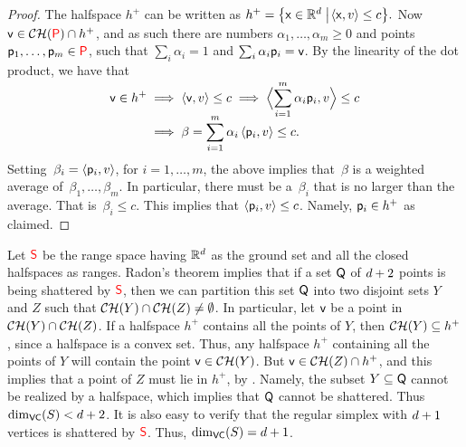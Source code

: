\begin{proof}
    The halfspace $h^+$ can be written as
    \begin{math}
        h^+ = \left\{  {\mathsf{x}} \in \mathbb{R}^d  \;\middle\vert\; \! \left\langle {{{\mathsf{x}}},{v}} \right\rangle \leq
           c \right\}\!.
    \end{math}
     Now $\pntB \in \CHX{\PntSet} \cap h^+$, and as such
    there are numbers $\alpha_1, \ldots, \alpha_m \geq 0$ and points
    $\mathsf{p}_1,\ldots, \mathsf{p}_m \in {{\textcolor{red}{\mathsf{P}}}}$, such that
    $\sum_i \alpha_i = 1$ and $\sum_i \alpha_i \mathsf{p}_i =\mathsf{v}$. By the
    linearity of the dot product, we have that
    \begin{align*}
        \pntB \in h^+ %
        &\implies%
        \DotProd{\pntB }{v} \leq c%
        \implies%
        \DotProd{\Bigl.\smash{\sum_{i=1}^m \alpha_i \pnt_i }}{v} \leq c%
        \\&
        \implies%
        \beta = \sum_{i=1}^m \alpha_i\DotProd{ \pnt_i }{v} \leq c.        
    \end{align*}
    Setting $\,\beta_i = \left\langle {{ \mathsf{p}_i },{v}} \right\rangle$, for $i=1,\ldots, m$,
    the above implies that $\,\beta$ is a weighted average of
    $\,\beta_1, \ldots, \beta_m$. In particular, there must be a
    $\,\beta_i$ that is no larger than the average. That is
    $\,\beta_i \leq c$. This implies that
    $\left\langle {{ \mathsf{p}_i },{v}} \right\rangle \leq c$. Namely, $\mathsf{p}_i \in h^+$ as
    claimed.
\end{proof}



Let ${\textcolor{red}{\mathsf{S}}}$ be the range space having $\mathbb{R}^d$ as the ground
set and all the closed halfspaces as ranges.  Radon's theorem implies
that if a set ${{\mathsf{Q}}}$ of $d + 2$ points is being shattered by
${\textcolor{red}{\mathsf{S}}}$, then we can partition this set ${{\mathsf{Q}}}$ into two
disjoint sets $Y$ and $Z$ such that $\CHX{Y} \cap \CHX{Z} \ne
\emptyset$. In particular, let $\mathsf{v}$ be a point in $\CHX{Y} \cap
\CHX{Z}$.  If a halfspace $h^+$ contains all the points of $Y$, then
$\CHX{Y} \subseteq h^+$, since a halfspace is a convex set.  Thus, any
halfspace $h^+$ containing all the points of $Y$ will contain the
point $\pntB \in \CHX{Y}$. But $\pntB \in \CHX{Z} \cap h^+$, and this
implies that a point of $Z$ must lie in $h^+$, by
.  Namely, the subset $Y \subseteq
{{\mathsf{Q}}}$ cannot be realized by a halfspace, which implies that
${{\mathsf{Q}}}$ cannot be shattered. Thus $\mathrm{dim}_{\mathsf{VC}}(S) < d+2$. It is also
easy to verify that the regular simplex with $d+1$ vertices is
shattered by ${\textcolor{red}{\mathsf{S}}}$. Thus, $\mathrm{dim}_{\mathsf{VC}}(S) = d+1$.

